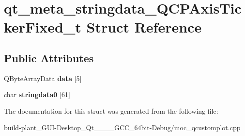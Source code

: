 \hypertarget{structqt__meta__stringdata__QCPAxisTickerFixed__t}{}\section{qt\+\_\+meta\+\_\+stringdata\+\_\+\+Q\+C\+P\+Axis\+Ticker\+Fixed\+\_\+t Struct Reference}
\label{structqt__meta__stringdata__QCPAxisTickerFixed__t}
\subsection*{Public Attributes}
\begin{DoxyCompactItemize}
\item 
\mbox{\label{structqt__meta__stringdata__QCPAxisTickerFixed__t_a6a154326b81876525a18cc787d72999a}} 
Q\+Byte\+Array\+Data {\bfseries data} \mbox{[}5\mbox{]}
\item 
\mbox{\label{structqt__meta__stringdata__QCPAxisTickerFixed__t_a4624793f0a8202895228fd43a030e135}} 
char {\bfseries stringdata0} \mbox{[}61\mbox{]}
\end{DoxyCompactItemize}


The documentation for this struct was generated from the following file\+:\begin{DoxyCompactItemize}
\item 
build-\/plant\+\_\+\+G\+U\+I-\/\+Desktop\+\_\+\+Qt\+\_\+\_\+\_\+\_\+\+G\+C\+C\+\_\+64bit-\/\+Debug/moc\+\_\+qcustomplot.\+cpp\end{DoxyCompactItemize}
